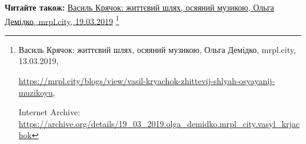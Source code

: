  
 
 
 
 

\textbf{Читайте також:} \href{https://archive.org/details/19_03_2019.olga_demidko.mrpl_city.vasyl_krjachok}{%
Василь Крячок: життєвий шлях, осяяний музикою, Ольга Демідко, mrpl.city, 19.03.2019}%
\footnote{Василь Крячок: життєвий шлях, осяяний музикою, Ольга Демідко, mrpl.city, 13.03.2019, \par\url{https://mrpl.city/blogs/view/vasil-kryachok-zhittevij-shlyah-osyayanij-muzikoyu}, \par Internet Archive: \url{https://archive.org/details/19_03_2019.olga_demidko.mrpl_city.vasyl_krjachok}}
